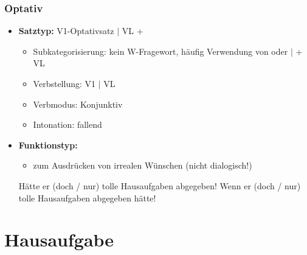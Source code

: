 \begin{frame}
\frametitle{Optativ}

\begin{itemize}
	\item \textbf{Satztyp:} V1-Optativsatz $|$ VL + 
	\begin{itemize}
		\item Subkategorisierung: kein W-Fragewort, häufig Verwendung von  oder  $|$  + VL
		\item Verbstellung: V1 $|$ VL
		\item Verbmodus: Konjunktiv
		\item Intonation: fallend
	\end{itemize}
	\item \textbf{Funktionstyp:}
	\begin{itemize}
		\item zum Ausdrücken von irrealen Wünschen (nicht dialogisch!)
	\end{itemize}
	
	\eal
	\ex Hätte er (doch / nur) tolle Hausaufgaben abgegeben! 
	\ex Wenn er (doch / nur) tolle Hausaufgaben abgegeben hätte!
	\zl
		
\end{itemize}

\end{frame}


\section{Hausaufgabe}


